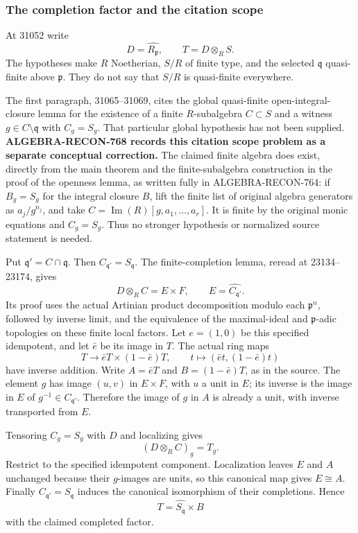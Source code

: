 \subsubsection{The completion factor and the citation scope}\label{algebra-proof-033-the-completion-factor-and-the-citation-scope}

At 31052 write \[
 D=\widehat{R_{\mathfrak p}},\qquad T=D\otimes_R S.
\] The hypotheses make \(R\) Noetherian, \(S/R\) of finite type, and the selected \(\mathfrak q\) quasi-finite above \(\mathfrak p\). They do not say that \(S/R\) is quasi-finite everywhere.

The first paragraph, 31065--31069, cites the global quasi-finite open-integral-closure lemma for the existence of a finite \(R\)-subalgebra \(C\subset S\) and a witness \(g\in C\setminus\mathfrak q\) with \(C_g=S_g\). That particular global hypothesis has not been supplied. \textbf{ALGEBRA-RECON-768 records this citation scope problem as a separate conceptual correction.} The claimed finite algebra does exist, directly from the main theorem and the finite-subalgebra construction in the proof of the openness lemma, as written fully in ALGEBRA-RECON-764: if \(B_g=S_g\) for the integral closure \(B\), lift the finite list of original algebra generators as \(a_j/g^{n_j}\), and take \(C=\operatorname{Im}(R)[g,a_1,\ldots,a_r]\). It is finite by the original monic equations and \(C_g=S_g\). Thus no stronger hypothesis or normalized source statement is needed.

Put \(\mathfrak q'=C\cap\mathfrak q\). Then \(C_{\mathfrak q'}=S_{\mathfrak q}\). The finite-completion lemma, reread at 23134--23174, gives \[
 D\otimes_R C=E\times F,\qquad
 E=\widehat{C_{\mathfrak q'}}.
\] Its proof uses the actual Artinian product decomposition modulo each \(\mathfrak p^n\), followed by inverse limit, and the equivalence of the maximal-ideal and \(\mathfrak p\)-adic topologies on these finite local factors. Let \(e=(1,0)\) be this specified idempotent, and let \(\bar e\) be its image in \(T\). The actual ring maps \[
 T\longrightarrow \bar eT\times(1-\bar e)T,\qquad
 t\longmapsto(\bar et,(1-\bar e)t)
\] have inverse addition. Write \(A=\bar eT\) and \(B=(1-\bar e)T\), as in the source. The element \(g\) has image \((u,v)\) in \(E\times F\), with \(u\) a unit in \(E\); its inverse is the image in \(E\) of \(g^{-1}\in C_{\mathfrak q'}\). Therefore the image of \(g\) in \(A\) is already a unit, with inverse transported from \(E\).

Tensoring \(C_g=S_g\) with \(D\) and localizing gives \[
 (D\otimes_R C)_g=T_g.
\] Restrict to the specified idempotent component. Localization leaves \(E\) and \(A\) unchanged because their \(g\)-images are units, so this canonical map gives \(E\cong A\). Finally \(C_{\mathfrak q'}=S_{\mathfrak q}\) induces the canonical isomorphism of their completions. Hence \[
 T=\widehat{S_{\mathfrak q}}\times B
\] with the claimed completed factor.

